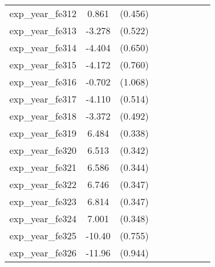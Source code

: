 {\begin{tabular}{l*{4}{cc}}
exp\_year\_fe312&    0.861         &  (0.456)&                  &         &                  &         &                  &         \\
exp\_year\_fe313&   -3.278\sym{***}&  (0.522)&                  &         &                  &         &                  &         \\
exp\_year\_fe314&   -4.404\sym{***}&  (0.650)&                  &         &                  &         &                  &         \\
exp\_year\_fe315&   -4.172\sym{***}&  (0.760)&                  &         &                  &         &                  &         \\
exp\_year\_fe316&   -0.702         &  (1.068)&                  &         &                  &         &                  &         \\
exp\_year\_fe317&   -4.110\sym{***}&  (0.514)&                  &         &                  &         &                  &         \\
exp\_year\_fe318&   -3.372\sym{***}&  (0.492)&                  &         &                  &         &                  &         \\
exp\_year\_fe319&    6.484\sym{***}&  (0.338)&                  &         &                  &         &                  &         \\
exp\_year\_fe320&    6.513\sym{***}&  (0.342)&                  &         &                  &         &                  &         \\
exp\_year\_fe321&    6.586\sym{***}&  (0.344)&                  &         &                  &         &                  &         \\
exp\_year\_fe322&    6.746\sym{***}&  (0.347)&                  &         &                  &         &                  &         \\
exp\_year\_fe323&    6.814\sym{***}&  (0.347)&                  &         &                  &         &                  &         \\
exp\_year\_fe324&    7.001\sym{***}&  (0.348)&                  &         &                  &         &                  &         \\
exp\_year\_fe325&   -10.40\sym{***}&  (0.755)&                  &         &                  &         &                  &         \\
exp\_year\_fe326&   -11.96\sym{***}&  (0.944)&                  &         &                  &         &                  &         \\

\end{tabular}}
